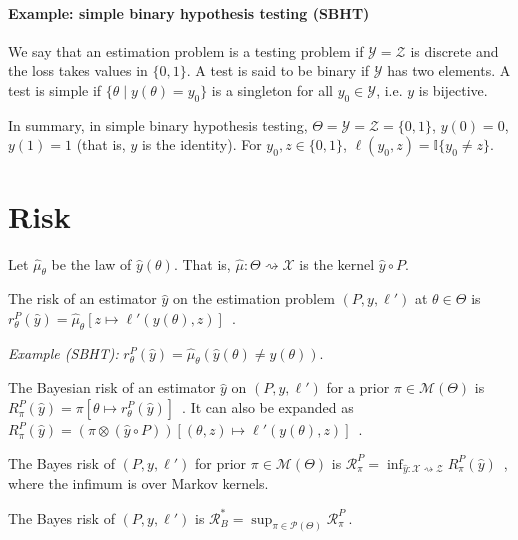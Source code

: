 \paragraph{Example: simple binary hypothesis testing (SBHT)}

We say that an estimation problem is a testing problem if $\mathcal Y = \mathcal Z$ is discrete and the loss takes values in $\{0, 1\}$.
A test is said to be binary if $\mathcal Y$ has two elements.
A test is simple if $\{\theta \mid y(\theta) = y_0\}$ is a singleton for all $y_0 \in \mathcal Y$, i.e. $y$ is bijective.

In summary, in simple binary hypothesis testing, $\Theta = \mathcal Y = \mathcal Z = \{0,1\}$, $y(0) = 0$, $y(1) = 1$ (that is, $y$ is the identity). For $y_0, z \in \{0,1\}$, $\ell(y_0, z) = \mathbb{I}\{y_0 \ne z\}$.

\section{Risk}

Let $\hat{\mu}_\theta$ be the law of $\hat{y}(\theta)$. That is, $\hat{\mu} : \mathcal \Theta \rightsquigarrow \mathcal X$ is the kernel $\hat{y} \circ P$.

\begin{definition}[Risk]
  \label{def:risk}
  \leanok
  The risk of an estimator $\hat{y}$ on the estimation problem $(P, y, \ell')$ at $\theta \in \Theta$ is $r^P_\theta(\hat{y}) = \hat{\mu}_\theta\left[z \mapsto \ell'(y(\theta), z)\right]$~.
\end{definition}

\emph{Example (SBHT):} $r^P_\theta(\hat{y}) = \hat{\mu}_\theta(\hat{y}(\theta) \ne y(\theta))$.


\begin{definition}
  \label{def:bayesianRisk}
  \leanok
  The Bayesian risk of an estimator $\hat{y}$ on $(P, y, \ell')$ for a prior $\pi \in \mathcal M(\Theta)$ is $R^P_\pi(\hat{y}) = \pi\left[\theta \mapsto r^P_\theta(\hat{y})\right]$~. It can also be expanded as $R^P_\pi(\hat{y}) = (\pi \otimes (\hat{y} \circ P))\left[ (\theta, z) \mapsto \ell'(y(\theta), z) \right]$~.
\end{definition}


\begin{definition}
  \label{def:bayesRisk}
  \leanok
  The Bayes risk of $(P, y, \ell')$ for prior $\pi \in \mathcal M(\Theta)$ is $\mathcal R^P_\pi = \inf_{\hat{y} : \mathcal X \rightsquigarrow \mathcal Z} R^P_\pi(\hat{y})$~, where the infimum is over Markov kernels.

  The Bayes risk of $(P, y, \ell')$ is $\mathcal R^*_B = \sup_{\pi \in \mathcal P(\Theta)} \mathcal R^P_\pi \: .$
\end{definition}

